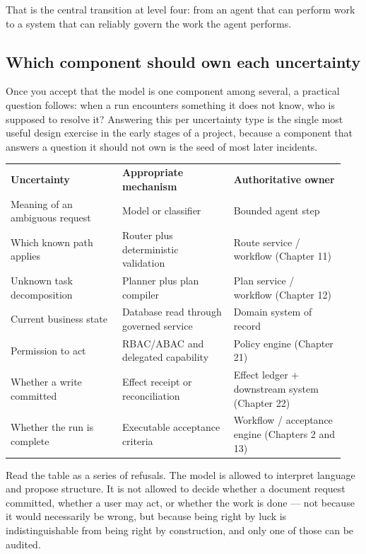 That is the central transition at level four: from an agent that can perform work to a system that can reliably govern the work the agent performs.\par

\subsection{Which component should own each uncertainty}

Once you accept that the model is one component among several, a practical question follows: when a run encounters something it does not know, who is supposed to resolve it? Answering this per uncertainty type is the single most useful design exercise in the early stages of a project, because a component that answers a question it should not own is the seed of most later incidents.\par

\BookTableStart
\small
\begin{tabular}{@{}Y{0.3133\linewidth}Y{0.3133\linewidth}Y{0.3133\linewidth}@{}}
\color{white}\bfseries \textbf{Uncertainty} & \color{white}\bfseries \textbf{Appropriate mechanism} & \color{white}\bfseries \textbf{Authoritative owner} \\
Meaning of an ambiguous request & Model or classifier & Bounded agent step \\
Which known path applies & Router plus deterministic validation & Route service / workflow (Chapter 11) \\
Unknown task decomposition & Planner plus plan compiler & Plan service / workflow (Chapter 12) \\
Current business state & Database read through governed service & Domain system of record \\
Permission to act & RBAC/ABAC and delegated capability & Policy engine (Chapter 21) \\
Whether a write committed & Effect receipt or reconciliation & Effect ledger + downstream system (Chapter 22) \\
Whether the run is complete & Executable acceptance criteria & Workflow / acceptance engine (Chapters 2 and 13) \\
\end{tabular}
\BookTableEnd

Read the table as a series of refusals. The model is allowed to interpret language and propose structure. It is not allowed to decide whether a document request committed, whether a user may act, or whether the work is done — not because it would necessarily be wrong, but because being right by luck is indistinguishable from being right by construction, and only one of those can be audited.\par

